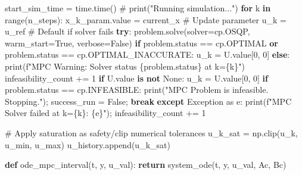 \documentclass[
  letterpaper,
  DIV=11,
  numbers=noendperiod,
  oneside]{scrartcl}
\newenvironment{Shaded}{\begin{snugshade}}{\end{snugshade}}
\newcommand{\BuiltInTok}[1]{\textcolor[rgb]{0.00,0.23,0.31}{#1}}
\newcommand{\CommentTok}[1]{\textcolor[rgb]{0.37,0.37,0.37}{#1}}
\newcommand{\ControlFlowTok}[1]{\textcolor[rgb]{0.00,0.23,0.31}{\textbf{#1}}}
\newcommand{\DecValTok}[1]{\textcolor[rgb]{0.68,0.00,0.00}{#1}}
\newcommand{\ImportTok}[1]{\textcolor[rgb]{0.00,0.46,0.62}{#1}}
\newcommand{\KeywordTok}[1]{\textcolor[rgb]{0.00,0.23,0.31}{\textbf{#1}}}
\newcommand{\NormalTok}[1]{\textcolor[rgb]{0.00,0.23,0.31}{#1}}
\newcommand{\OperatorTok}[1]{\textcolor[rgb]{0.37,0.37,0.37}{#1}}
\newcommand{\PreprocessorTok}[1]{\textcolor[rgb]{0.68,0.00,0.00}{#1}}
\newcommand{\SpecialCharTok}[1]{\textcolor[rgb]{0.37,0.37,0.37}{#1}}
\newcommand{\SpecialStringTok}[1]{\textcolor[rgb]{0.13,0.47,0.30}{#1}}
\newcommand{\StringTok}[1]{\textcolor[rgb]{0.13,0.47,0.30}{#1}}
\newcommand{\VariableTok}[1]{\textcolor[rgb]{0.07,0.07,0.07}{#1}}
\begin{document}
\begin{Shaded}
\begin{Highlighting}[numbers=left,,]
\NormalTok{start\_sim\_time }\OperatorTok{=}\NormalTok{ time.time()}
\CommentTok{\# print("Running simulation...")}
\ControlFlowTok{for}\NormalTok{ k }\KeywordTok{in} \BuiltInTok{range}\NormalTok{(n\_steps):}
\NormalTok{    x\_k\_param.value }\OperatorTok{=}\NormalTok{ current\_x }\CommentTok{\# Update parameter}
\NormalTok{    u\_k }\OperatorTok{=}\NormalTok{ u\_ref }\CommentTok{\# Default if solver fails}
    \ControlFlowTok{try}\NormalTok{:}
\NormalTok{        problem.solve(solver}\OperatorTok{=}\NormalTok{cp.OSQP, warm\_start}\OperatorTok{=}\VariableTok{True}\NormalTok{, verbose}\OperatorTok{=}\VariableTok{False}\NormalTok{)}
        \ControlFlowTok{if}\NormalTok{ problem.status }\OperatorTok{==}\NormalTok{ cp.OPTIMAL }\KeywordTok{or}\NormalTok{ problem.status }\OperatorTok{==}\NormalTok{ cp.OPTIMAL\_INACCURATE:}
\NormalTok{            u\_k }\OperatorTok{=}\NormalTok{ U.value[}\DecValTok{0}\NormalTok{, }\DecValTok{0}\NormalTok{]}
        \ControlFlowTok{else}\NormalTok{:}
            \BuiltInTok{print}\NormalTok{(}\SpecialStringTok{f"MPC Warning: Solver status }\SpecialCharTok{\{}\NormalTok{problem}\SpecialCharTok{.}\NormalTok{status}\SpecialCharTok{\}}\SpecialStringTok{ at k=}\SpecialCharTok{\{}\NormalTok{k}\SpecialCharTok{\}}\SpecialStringTok{"}\NormalTok{)}
\NormalTok{            infeasibility\_count }\OperatorTok{+=} \DecValTok{1}
            \ControlFlowTok{if}\NormalTok{ U.value }\KeywordTok{is} \KeywordTok{not} \VariableTok{None}\NormalTok{: u\_k }\OperatorTok{=}\NormalTok{ U.value[}\DecValTok{0}\NormalTok{, }\DecValTok{0}\NormalTok{]}
            \ControlFlowTok{if}\NormalTok{ problem.status }\OperatorTok{==}\NormalTok{ cp.INFEASIBLE:}
                 \BuiltInTok{print}\NormalTok{(}\StringTok{"MPC Problem is infeasible. Stopping."}\NormalTok{)}\OperatorTok{;}\NormalTok{ success\_run }\OperatorTok{=} \VariableTok{False}\OperatorTok{;} \ControlFlowTok{break}
    \ControlFlowTok{except} \PreprocessorTok{Exception} \ImportTok{as}\NormalTok{ e:}
        \BuiltInTok{print}\NormalTok{(}\SpecialStringTok{f"MPC Solver failed at k=}\SpecialCharTok{\{}\NormalTok{k}\SpecialCharTok{\}}\SpecialStringTok{: }\SpecialCharTok{\{}\NormalTok{e}\SpecialCharTok{\}}\SpecialStringTok{"}\NormalTok{)}\OperatorTok{;}\NormalTok{ infeasibility\_count }\OperatorTok{+=} \DecValTok{1}

    \CommentTok{\# Apply saturation as safety/clip numerical tolerances}
\NormalTok{    u\_k\_sat }\OperatorTok{=}\NormalTok{ np.clip(u\_k, u\_min, u\_max)}
\NormalTok{    u\_history.append(u\_k\_sat)}

    \KeywordTok{def}\NormalTok{ ode\_mpc\_interval(t, y, u\_val):}
        \ControlFlowTok{return}\NormalTok{ system\_ode(t, y, u\_val, Ac, Bc)}


\end{Highlighting}
\end{Shaded}
\end{document}
